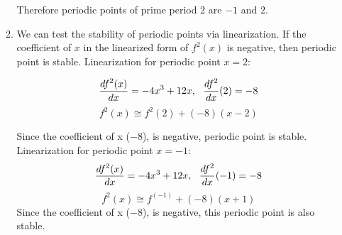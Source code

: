 \documentclass[12pt,a4paper, margin=1in]{article}
\begin{document}
\begin{enumerate}
\begin{enumerate}
                Therefore periodic points of prime period 2 are $-1$ and $2$.

            \item 
                We can test the stability of periodic points via linearization. If the coefficient 
                of $x$ in the linearized form of $f^2(x)$ is negative, then periodic point is stable.
                \newline \newline
                Linearization for periodic point $x=2$:

                \begin{equation*}
                    \ddfrac{df^2(x)}{dx} = -4x^3+12x, \ \ \ddfrac{df^2}{dx}(2) = -8
                \end{equation*}
                \begin{equation*}
                    f^2(x) \cong f^2(2) + (-8)(x-2)
                \end{equation*}

                Since the coefficient of x ($-8$), is negative, periodic point is stable.
                \newline \newline
                Linearization for periodic point $x=-1$:
                \begin{equation*}
                    \ddfrac{df^2(x)}{dx} = -4x^3+12x, \ \ \ddfrac{df^2}{dx}(-1) = -8
                \end{equation*}
                \begin{equation*}
                    f^2(x) \cong f^(-1) + (-8)(x+1)
                \end{equation*}
                Since the coefficient of x ($-8$), is negative, this periodic point is also stable.
        \end{enumerate}


\end{enumerate}
\end{document}
